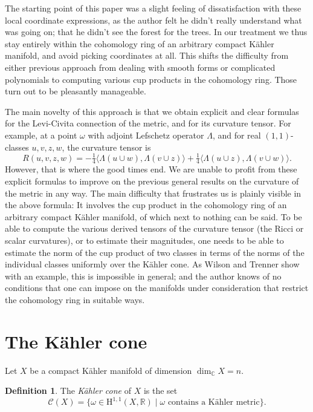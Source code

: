 \documentclass[11pt,a4paper]{amsart}
\theoremstyle{definition}
\newtheorem*{defi}{Definition}
\theoremstyle{remark}
\newcommand{\RR}{\mathbb{R}}
\newcommand{\CC}{\mathbb{C}}
\def\onfo{\tfrac14}
\def\coho#1{\mathrm{H}^{#1}}
\def\kf{\omega}
\def\Lef{\Lambda}
\def\ton{u}
\def\ttw{v}
\def\tth{z}
\def\tfo{w}
\def\KC{C}
\def\RKC{\mathcal{\KC}}
\begin{document}
The starting point of this paper was a slight feeling of dissatisfaction with
these local coordinate expressions, as the author felt he didn't really
understand what was going on; that he didn't see the forest for the trees. In
our treatment we thus stay entirely within the cohomology ring of an arbitrary
compact K\"{a}hler manifold, and avoid picking coordinates at all. This shifts
the difficulty from either previous approach from dealing with smooth forms or
complicated polynomials to computing various cup products in the cohomology
ring. Those turn out to be pleasantly manageable. 

The main novelty of this approach is that we obtain explicit and clear formulas
for the Levi-Civita connection of the metric, and for its curvature tensor. For
example, at a point $\kf$ with adjoint Lefschetz operator $\Lambda$, and for
real $(1,1)$-classes $\ton, \ttw, \tth, \tfo$, the curvature tensor is
$$
R(\ton,\ttw,\tth,\tfo)
=
- \onfo \langle \Lef(\ton \cup \tfo), \Lef(\ttw \cup \tth) \rangle
+ \onfo \langle \Lef(\ton \cup \tth), \Lef(\ttw \cup \tfo) \rangle.
$$
However, that is where the good times end. We are unable to profit from these
explicit formulas to improve on the previous general results on the curvature of
the metric in any way. The main difficulty that frustrates us is plainly visible
in the above formula: It involves the cup product in the cohomology ring of an
arbitrary compact K\"{a}hler manifold, of which next to nothing can be said. To be
able to compute the various derived tensors of the curvature tensor (the Ricci
or scalar curvatures), or to estimate their magnitudes, one needs to be able to
estimate the norm of the cup product of two classes in terms of the norms of the
individual classes uniformly over the K\"{a}hler cone. As Wilson and Trenner show
with an example, this is impossible in general; and the author knows of no
conditions that one can impose on the manifolds under consideration that
restrict the cohomology ring in suitable ways.



\section{The K\"{a}hler cone}

Let $X$ be a compact K\"{a}hler manifold of dimension $\dim_{\CC} X = n$.

\begin{defi}
The \emph{K\"{a}hler cone} of $X$ is the set
\begin{equation*}
\RKC(X) = \{ \kf \in \coho{1,1}(X,\RR) 
\mid
\text{$\kf$ contains a K\"{a}hler metric}
\}.
\end{equation*}
\end{defi}
\end{document}
